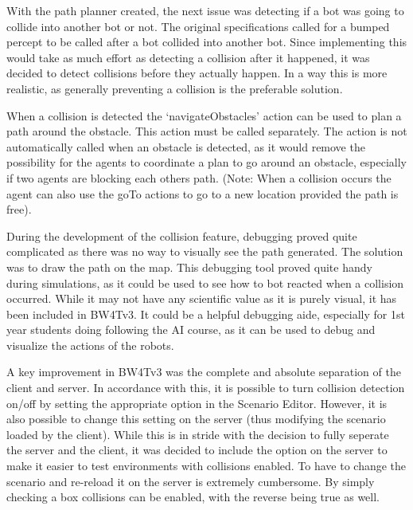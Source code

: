 With the path planner created, the next issue was detecting if a bot was going to collide into another bot or not. The original specifications called for a bumped percept to be called after a bot collided into another bot. Since implementing this would take as much effort as detecting a collision after it happened, it was decided to detect collisions before they actually happen. In a way this is more realistic, as generally preventing a collision is the preferable solution.

When a collision is detected the `navigateObstacles' action can be used to plan a path around the obstacle. This action must be called separately. The action is not automatically called when an obstacle is detected, as it would remove the possibility for the agents to coordinate a plan to go around an obstacle, especially if two agents are blocking each others path. (Note: When a collision occurs the agent can also use the goTo actions to go to a new location provided the path is free).

During the development of the collision feature, debugging proved quite complicated as there was no way to visually see the path generated. The solution was to draw the path on the map. This debugging tool proved quite handy during simulations, as it could be used to see how to bot reacted when a collision occurred. While it may not have any scientific value as it is purely visual, it has been included in BW4Tv3. It could be a helpful debugging aide, especially for 1st year students doing following the AI course, as it can be used to debug and visualize the actions of the robots. 

A key improvement in BW4Tv3 was the complete and absolute separation of the client and server. In accordance with this, it is possible to turn collision detection on/off  by setting the appropriate option in the Scenario Editor. However, it is also possible to change this setting on the server (thus modifying the scenario loaded by the client). While this is in stride with the decision to fully seperate the server and the client, it was decided to include the option on the server to make it easier to test environments with collisions enabled. To have to change the scenario and re-reload it on the server is extremely cumbersome. By simply checking a box collisions can be enabled, with the reverse being true as well. 

